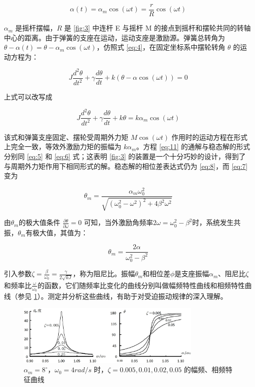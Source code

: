 \documentclass[12pt,a4paper]{amsart}
\begin{document}
\begin{equation}
    \alpha(t) = \alpha_m \cos(\omega t) = \frac{r}{R}\cos(\omega t) \label{eq:9}
\end{equation}

$\alpha_m$ 是摇杆摆幅，$R$ 是 \ref{fig:3} 中连杆 E 与摇杆 M 的接点到摇杆和摆轮共同的转轴中心的距离。由于弹簧的支座在运动，运动支座是激励源。弹簧总转角为 $\theta-\alpha(t)=\theta-\alpha_m\cos(\omega t)$，仿照式 \ref{eq:4}，在固定坐标系中摆轮转角 $\theta$ 的运动方程为：

\begin{equation}
    J\frac{d^2\theta}{dt^2} + \gamma\frac{d\theta}{dt} + k(\theta - \alpha\cos(\omega t)) = 0 \label{eq:10}
\end{equation}

上式可以改写成

\begin{equation}
    J\frac{d^2\theta}{dt^2} + \gamma\frac{d\theta}{dt} + k\theta = k\alpha_m\cos(\omega t) \label{eq:11}
\end{equation}

该式和弹簧支座固定、摆轮受周期外力矩 $M\cos(\omega t)$ 作用时的运动方程在形式上完全一致，等效外激励力矩的振幅为 $k\alpha_m$。方程 \ref{eq:11} 的通解与稳态解的形式分别同 \ref{eq:5} 和 \ref{eq:6} 式；这表明 \ref{fig:3} 的装置是一个十分巧妙的设计，得到了与周期外力矩作用下相同形式的解。稳态解的相位差表达式仍为 \ref{eq:8}，而 \ref{eq:7} 变为 

\begin{equation}
	\theta_m = \frac{\alpha_m\omega_0^2}{\sqrt{(\omega_0^2 - \omega^2)^2 + 4\beta^2\omega^2}} \label{eq:12}
\end{equation}

由$\theta_m$的极大值条件 $\frac{\partial \theta}{\partial \omega}=0$ 可知，当外激励角频率$2\omega = \omega_0^2 - \beta^2$时，系统发生共振，$\theta_m$有极大值，其值为：

\begin{equation}
    \theta_m = \frac{2\alpha}{\omega_0^2 - \beta^2} \label{eq:13}
\end{equation}

引入参数$\zeta = \frac{\beta}{\omega_0} = \frac{\gamma}{2\sqrt{kJ}}$，称为阻尼比。振幅$\theta_m$和相位差$\phi$是支座振幅$\alpha_m$、阻尼比$\zeta$和频率比$\frac{\omega}{\omega_0}$的函数，它们随频率比变化的曲线分别叫做幅频特性曲线和相频特性曲线（参见 \ref{fig:graph}）。测定并分析这些曲线，有助于对受迫振动规律的深入理解。

\begin{figure}
    \centering
    \includegraphics[width=0.8\textwidth]{img/graph.jpg}
    \caption{$\alpha_m=8^\circ$，$\omega_0=4 rad/s$ 时，$\zeta=0.005, 0.01, 0.02, 0.05$ 的幅频、相频特征曲线}
    \label{fig:graph}
\end{figure}
\end{document}
